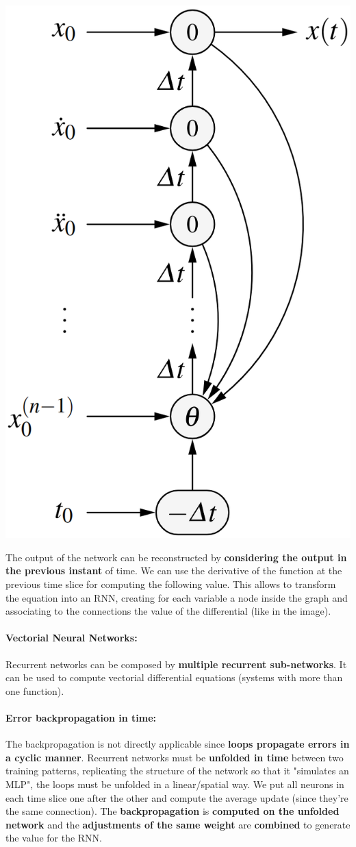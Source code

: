 \documentclass[11pt]{article}
\begin{document}
		\begin{center}
			\includegraphics[width=0.4\columnwidth]{img/NN/RN1}
		\end{center}
		The output of the network can be reconstructed by \textbf{considering the output in the previous instant} of time. We can use the derivative of the function at the previous time slice for computing the following value. This allows to transform the equation into an RNN, creating for each variable a node inside the graph and associating to the connections the value of the differential (like in the image).\\
		
		\paragraph{Vectorial Neural Networks:} Recurrent networks can be composed by \textbf{multiple recurrent sub-networks}. It can be used to compute vectorial differential equations (systems with more than one function).
		
		\paragraph{Error backpropagation in time:}  The backpropagation is not directly applicable since \textbf{loops propagate errors in a cyclic manner}. Recurrent networks must be \textbf{unfolded in time} between two training patterns, replicating the structure of the network so that it "simulates an MLP", the loops must be unfolded in a linear/spatial way. We put all neurons in each time slice one after the other and compute the average update (since they're the same connection). The \textbf{backpropagation} is \textbf{computed on the unfolded network} and the \textbf{adjustments of the same weight} are \textbf{combined} to generate the value for the RNN.\\
		
		\newpage
		
		
		
		
	
\end{document}
